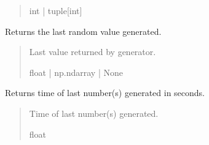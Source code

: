 \documentclass[letterpaper,10pt,english]{sphinxmanual}
\begin{document}
\begin{fulllineitems}
\begin{fulllineitems}
\begin{quote}
\begin{description}
\sphinxAtStartPar
int | tuple{[}int{]}

\end{description}\end{quote}

\end{fulllineitems}


\begin{fulllineitems}
\label{\detokenize{modules/util/rng:qnav.util.rng.GaussianMarkov.last_value}}
\pysigstartsignatures
{}
\pysigstopsignatures
\sphinxAtStartPar
Returns the last random value generated.
\begin{quote}\begin{description}
\sphinxAtStartPar
Last value returned by generator.

\sphinxAtStartPar
float | np.ndarray | None

\end{description}\end{quote}

\end{fulllineitems}


\begin{fulllineitems}
\label{\detokenize{modules/util/rng:qnav.util.rng.GaussianMarkov.last_time}}
\pysigstartsignatures
{}
\pysigstopsignatures
\sphinxAtStartPar
Returns time of last number(s) generated in seconds.
\begin{quote}\begin{description}
\sphinxAtStartPar
Time of last number(s) generated.

\sphinxAtStartPar
float

\end{description}\end{quote}

\end{fulllineitems}


\end{fulllineitems}
\end{document}
